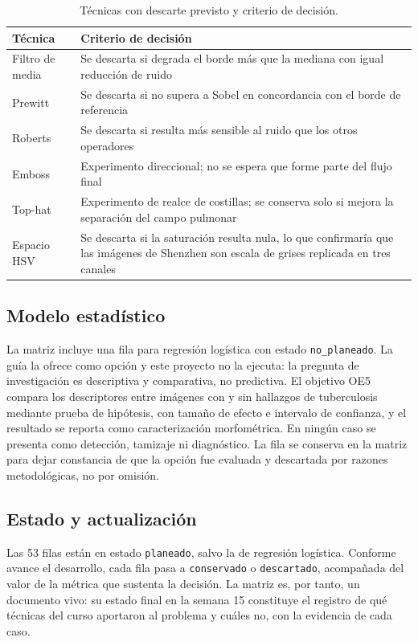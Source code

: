 \documentclass[12pt,a4paper]{article}
\begin{document}
\begin{table}[H]
\centering
\caption{Técnicas con descarte previsto y criterio de decisión.}
\small
\begin{tabular}{@{}p{3.4cm}p{10.2cm}@{}}
\toprule
\textbf{Técnica} & \textbf{Criterio de decisión} \\
\midrule
Filtro de media & Se descarta si degrada el borde más que la mediana con igual reducción de ruido \\
\addlinespace
Prewitt & Se descarta si no supera a Sobel en concordancia con el borde de referencia \\
\addlinespace
Roberts & Se descarta si resulta más sensible al ruido que los otros operadores \\
\addlinespace
Emboss & Experimento direccional; no se espera que forme parte del flujo final \\
\addlinespace
Top-hat & Experimento de realce de costillas; se conserva solo si mejora la separación del campo pulmonar \\
\addlinespace
Espacio HSV & Se descarta si la saturación resulta nula, lo que confirmaría que las imágenes de Shenzhen son escala de grises replicada en tres canales \\
\bottomrule
\end{tabular}
\end{table}

\subsection{Modelo estadístico}

La matriz incluye una fila para regresión logística con estado
\texttt{no\_planeado}. La guía la ofrece como opción y este proyecto no la
ejecuta: la pregunta de investigación es descriptiva y comparativa, no
predictiva. El objetivo OE5 compara los descriptores entre imágenes con y sin
hallazgos de tuberculosis mediante prueba de hipótesis, con tamaño de efecto e
intervalo de confianza, y el resultado se reporta como caracterización
morfométrica. En ningún caso se presenta como detección, tamizaje ni diagnóstico.
La fila se conserva en la matriz para dejar constancia de que la opción fue
evaluada y descartada por razones metodológicas, no por omisión.

\subsection{Estado y actualización}

Las 53 filas están en estado \texttt{planeado}, salvo la de regresión logística.
Conforme avance el desarrollo, cada fila pasa a \texttt{conservado} o
\texttt{descartado}, acompañada del valor de la métrica que sustenta la decisión.
La matriz es, por tanto, un documento vivo: su estado final en la semana 15
constituye el registro de qué técnicas del curso aportaron al problema y cuáles
no, con la evidencia de cada caso.
\end{document}
